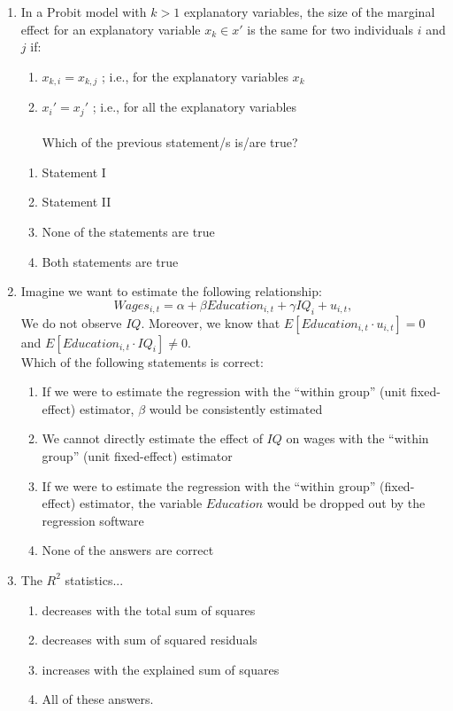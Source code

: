 \documentclass{article}
\begin{document}
\begin{enumerate}
    \item In a Probit model with $k>1$ explanatory variables, the size of the marginal effect  for an explanatory variable $x_k\in x'$ is the same for two individuals $i$ and $j$ if:
\begin{enumerate}
    \item[I.] $x_{k,i}=x_{k,j}$ ; i.e., for the explanatory variables $x_k$
    \item[II.] $x_i'=x_j'$ ; i.e., for all the explanatory variables\\\\
    Which of the previous statement/s is/are true? 
    \end{enumerate}
\begin{enumerate}[label=(\alph*)]
        \item Statement I
        \item Statement II
        \item None of the statements are true
        \item Both statements are true
\end{enumerate}\vspace{.25cm}


   \item Imagine we want to estimate the following relationship:
\[
Wages_{i,t}=\alpha+\beta Education_{i,t}+ \gamma IQ_i+u_{i,t}, 
\]
We do not observe $IQ$. Moreover, we know that $E[Education_{i,t} \cdot u_{i,t}]=0$ and  $E[Education_{i,t} \cdot IQ_i]\neq 0$.\\ Which of the following statements is correct:
\begin{enumerate}[label=(\alph*)]
    \item If we were to estimate the regression with the ``within group'' (unit fixed-effect) estimator, $\beta$ would be consistently estimated
    \item We cannot directly estimate the effect of $IQ$ on wages with the ``within group'' (unit fixed-effect) estimator 
    \item If we were to estimate the regression with the ``within group'' (fixed-effect) estimator, the variable $Education$ would be dropped out by the regression software
    \item None of the answers are correct
\end{enumerate}\vspace{.25cm}

    \item The $R^2$ statistics...
    \begin{enumerate}[label=\alph*)]
        \item decreases with the total sum of squares
        \item decreases with sum of squared residuals
        \item increases with the explained sum of squares
        \item All of these answers.
    \end{enumerate}\vspace{.25cm}



\end{enumerate}
\end{document}
